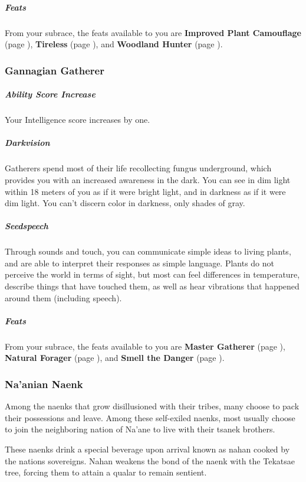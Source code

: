     \subparagraph{Feats} From your subrace, the feats available to you are
    \textbf{Improved Plant Camouflage} (page \pageref{feat::improvedplantcamouflage}),
    \textbf{Tireless} (page \pageref{feat::tireless}), and
    \textbf{Woodland Hunter} (page \pageref{feat::woodlandhunter}).

\subsubsection{Gannagian Gatherer}
    \subparagraph{Ability Score Increase} Your Intelligence score increases by one.

    \subparagraph{Darkvision} Gatherers spend most of their life recollecting fungus underground, which provides you with an increased awareness in the dark.
    You can see in dim light within 18 meters of you as if it were bright light, and in darkness as if it were dim light.
    You can't discern color in darkness, only shades of gray.

    \subparagraph{Seedspeech} Through sounds and touch, you can communicate simple ideas to living plants, and are able to interpret their responses as simple language.
    Plants do not perceive the world in terms of sight, but most can feel differences in temperature, describe things that have touched them, as well as hear vibrations that happened around them (including speech).

    \subparagraph{Feats} From your subrace, the feats available to you are
    \textbf{Master Gatherer} (page \pageref{feat::mastergatherer}),
    \textbf{Natural Forager} (page \pageref{feat::naturalforager}), and
    \textbf{Smell the Danger} (page \pageref{feat::smellthedanger}).

\subsubsection{Na'anian Naenk}
    Among the naenks that grow disillusioned with their tribes, many choose to pack their possessions and leave.
    Among these self-exiled naenks, most usually choose to join the neighboring nation of Na'ane to live with their tsanek brothers.

    These naenks drink a special beverage upon arrival known as nahan cooked by the nations sovereigns.
    Nahan weakens the bond of the naenk with the Tekatsae tree, forcing them to attain a qualar to remain sentient.

